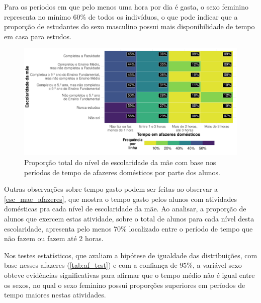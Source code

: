 Para os períodos em que pelo menos uma hora por dia é gasta, o sexo feminino
representa no mínimo 60\% de todos os indivíduos, o que pode indicar que a proporção 
de estudantes do sexo masculino possui mais disponibilidade de tempo em casa para estudos.

\begin{figure}[h]
    \caption{Proporção total do nível de escolaridade da mãe
    com base nos períodos de tempo de afazeres domésticos por parte dos alunos.\label{esc_mae_afazeres}}
    \begin{center}
        \includegraphics[width=16cm]{img/esc_mae_afazeres.pdf}
    \end{center}
\end{figure}

Outras observações sobre tempo gasto podem ser feitas ao observar a \autoref{esc_mae_afazeres},
que mostra o tempo gasto pelos alunos com atividades domésticas pra cada nível de escolaridade da mãe.
Ao analisar, a proporção de alunos que exercem estas atividade, sobre o total de alunos para cada nível
desta escolaridade, apresenta pelo menos 70\% localizado entre o período de tempo que 
não fazem ou fazem até 2 horas.

Nos testes estatísticos, que avaliam a hipótese de igualdade das distribuições, com base nesses afazeres (\autoref{tab:af_test}) e com a
confiança de 95\%, a variável sexo obteve evidências significativas para afirmar que o tempo
médio não é igual entre os sexos, no qual o sexo feminino possui
proporções superiores em períodos de tempo maiores nestas atividades.

